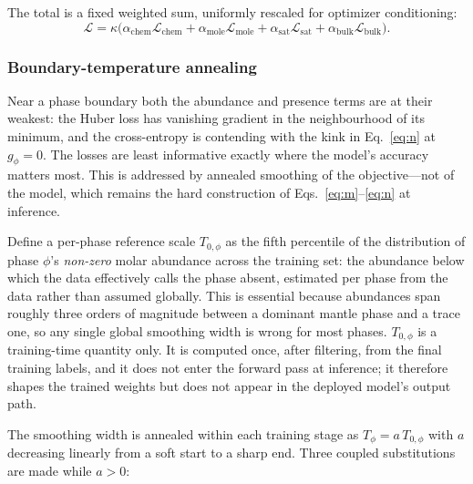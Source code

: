 The total is a fixed weighted sum, uniformly rescaled for optimizer conditioning:
\begin{equation}
  \mathcal{L} = \kappa\big(
      \alpha_{\mathrm{chem}}\mathcal{L}_{\mathrm{chem}}
    + \alpha_{\mathrm{mole}}\mathcal{L}_{\mathrm{mole}}
    + \alpha_{\mathrm{sat}}\mathcal{L}_{\mathrm{sat}}
    + \alpha_{\mathrm{bulk}}\mathcal{L}_{\mathrm{bulk}} \big).
\end{equation}


\subsubsection{Boundary-temperature annealing}
\label{sec:annealing}

Near a phase boundary both the abundance and presence terms are at their weakest: the
Huber loss has vanishing gradient in the neighbourhood of its minimum, and the
cross-entropy is contending with the kink in Eq.~\eqref{eq:n} at $g_\phi=0$. The
losses are least informative exactly where the model's accuracy matters most. This is
addressed by annealed smoothing of the objective---not of the model, which remains
the hard construction of Eqs.~\eqref{eq:m}--\eqref{eq:n} at inference.

Define a per-phase reference scale $T_{0,\phi}$ as the fifth percentile of the
distribution of phase $\phi$'s \emph{non-zero} molar abundance across the training
set: the abundance below which the data effectively calls the phase absent, estimated
per phase from the data rather than assumed globally. This is essential because
abundances span roughly three orders of magnitude between a dominant mantle phase and
a trace one, so any single global smoothing width is wrong for most phases.
$T_{0,\phi}$ is a training-time quantity only. It is computed once, after filtering,
from the final training labels, and it does not enter the forward pass at
inference; it therefore shapes the trained weights but does not appear in the
deployed model's output path.

The smoothing width is annealed within each training stage as $T_\phi = a\,T_{0,\phi}$
with $a$ decreasing linearly from a soft start to a sharp end. Three coupled
substitutions are made while $a > 0$:

